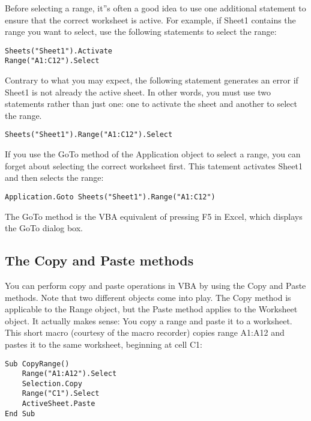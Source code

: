 \documentclass[
]{article}
\theoremstyle{definition}
\theoremstyle{definition}
\theoremstyle{definition}
\theoremstyle{definition}
\theoremstyle{remark}
\begin{document}
Before selecting a range, it''s often a good idea to use one additional statement to ensure that the correct worksheet is active. For example, if Sheet1 contains the range you want to select, use the following statements to select the range:

\begin{verbatim}
Sheets("Sheet1").Activate
Range("A1:C12").Select
\end{verbatim}

Contrary to what you may expect, the following statement generates an error if Sheet1 is not already the active sheet. In other words, you must use two statements rather than just one: one to activate the sheet and another to select the range.

\begin{verbatim}
Sheets("Sheet1").Range("A1:C12").Select
\end{verbatim}

If you use the GoTo method of the Application object to select a range, you can forget about selecting the correct worksheet first. This tatement activates Sheet1 and then selects the range:

\begin{verbatim}
Application.Goto Sheets("Sheet1").Range("A1:C12")
\end{verbatim}

The GoTo method is the VBA equivalent of pressing F5 in Excel, which displays the GoTo dialog box.

\hypertarget{the-copy-and-paste-methods}{%
\subsection{The Copy and Paste methods}\label{the-copy-and-paste-methods}}

You can perform copy and paste operations in VBA by using the Copy and Paste methods. Note that two different objects come into play. The Copy method is applicable to the Range object, but the Paste method applies to the Worksheet object. It actually makes sense: You copy a range and paste it to a worksheet. This short macro (courtesy of the macro recorder) copies range A1:A12 and pastes it to the same worksheet, beginning at cell C1:

\begin{verbatim}
Sub CopyRange()
    Range("A1:A12").Select
    Selection.Copy
    Range("C1").Select
    ActiveSheet.Paste
End Sub
\end{verbatim}
\end{document}
